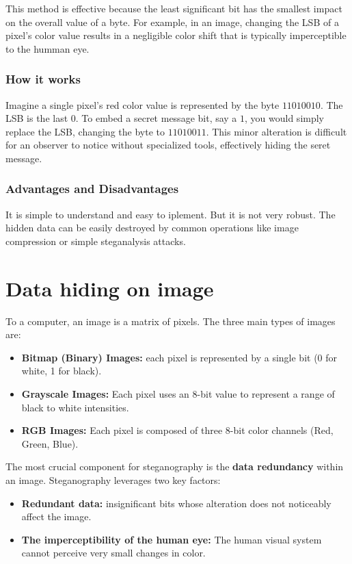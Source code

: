     This method is effective because the least significant bit has the smallest
    impact on the overall value of a byte. For example, in an image, changing
    the LSB of a pixel's color value results in a negligible color shift that is
    typically imperceptible to the humman eye.
    \subsection{How it works}
        Imagine a single pixel's red color value is represented by the byte
        \(11010010\). The LSB is the last \(0\). To embed a secret message bit,
        say a \(1\), you would simply replace the LSB, changing the byte to
        \(11010011\). This minor alteration is difficult for an observer to
        notice without specialized tools, effectively hiding the seret message.
    \subsection{Advantages and Disadvantages}
        It is simple to understand and easy to iplement. But it is not very
        robust. The hidden data can be easily destroyed by common operations
        like image compression or simple steganalysis attacks.
\chapter{Data hiding on image}
    To a computer, an image is a matrix of pixels. The three main types of
    images are:
    \begin{itemize}
        \item \textbf{Bitmap (Binary) Images:} each pixel is represented by a
            single bit (0 for white, 1 for black).
        \item \textbf{Grayscale Images:} Each pixel uses an 8-bit value to
            represent a range of black to white intensities.
        \item \textbf{RGB Images:} Each pixel is composed of three 8-bit color
            channels (Red, Green, Blue).
    \end{itemize}
    
    The most crucial component for steganography is the \textbf{data redundancy}
    within an image. Steganography leverages two key factors:
    \begin{itemize}
        \item \textbf{Redundant data:} insignificant bits whose alteration does
            not noticeably affect the image.
        \item \textbf{The imperceptibility of the human eye:} The human visual
            system cannot perceive very small changes in color.
    \end{itemize}
    
